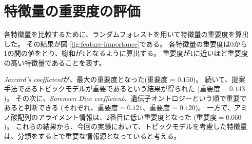 \documentclass[titlepage,12pt]{jreport}
\begin{document}


\section{特徴量の重要度の評価\label{importance-feature}}
各特徴量を比較するために、ランダムフォレストを用いて特徴量の重要度を算出した。 その結果が図 \ref{fig:feature-importance}である。 各特徴量の重要度は0から1の間の値をとり、総和が1となるように算出する。 重要度が1に近いほど重要度の高い特徴量であることを表す。

{\it Jaccard's coefficient}が、最大の重要度となった(重要度 = $0.150$)。 続いて、提案手法であるトピックモデルが重要であるという結果が得られた (重要度$ = 0.143$)。 その次に、{\it Sorensen Dice coefficient}、遺伝子オントロジーという順で重要であると判断できる (それぞれ、重要度$ = 0.121$、重要度 = $0.120$)。 一方で、アミノ酸配列のアライメント情報は、2番目に低い重要度となった (重要度$ = 0.060$)。 これらの結果から、今回の実験において、トピックモデルを考慮した特徴量は、分類をする上で重要な情報源となっていると考える。
\end{document}
